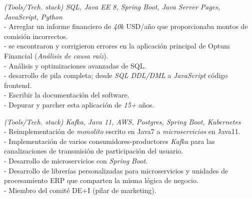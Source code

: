 \documentclass[]{CV-JuanCamiloFlorez}
\begin{document}
\begin{minipage}[t]{0.66\textwidth}
    \textit{(Tools/Tech. stack) SQL, Java EE 8, Spring Boot, Java Server Pages, JavaScript, Python} \\
        - Arreglar un informe financiero de \textit{40k} USD/año que proporcionaba montos de comisión incorrectos. \\
        - se encontraron y corrigieron errores en la aplicación principal de Optum Financial (\textit{Análisis de causa raíz}). \\
        - Análisis y optimizaciones avanzadas de SQL. \\
        - desarrollo de pila completa; desde \textit{SQL DDL/DML} a \textit{JavaScript} código frontend. \\
        - Escribir la documentación del software. \\
        - Depurar y parcher esta aplicación de \textit{15+} años. \\
        \sectionsep

    \textit{(Tools/Tech. stack) Kafka, Java 11, AWS, Postgres, Spring Boot, Kubernetes} \\
        - Reimplementación de \textit{monolito} escrito en Java7 a \textit{microservicios} en Java11. \\
        - Implementación de varios consumidores-productores \textit{Kafka} para las canalizaciones de transmisión de participación del usuario. \\
        - Desarrollo de microservicios con \textit{Spring Boot}. \\
        - Desarrollo de librerías personalizadas para microservicios y unidades de procesamiento ERP que comparten la misma lógica de negocio. \\
        - Miembro del comité DE+I (pilar de marketing). \\
        \sectionsep


\end{minipage}
\end{document}
